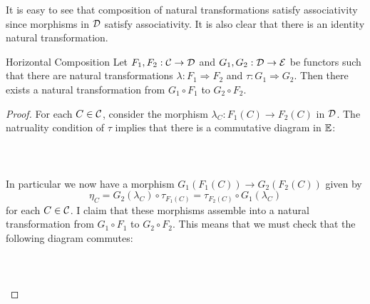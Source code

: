 \documentclass[a4paper]{article}
\begin{document}
It is easy to see that composition of natural transformations satisfy associativity since morphisms in $\mathcal{D}$ satisfy associativity. It is also clear that there is an identity natural transformation. 

\begin{prp}{Horizontal Composition}{} Let $F_1,F_2:\mathcal{C}\to\mathcal{D}$ and $G_1,G_2:\mathcal{D}\to\mathcal{E}$ be functors such that there are natural transformations $\lambda:F_1\Rightarrow F_2$ and $\tau:G_1\Rightarrow G_2$. Then there exists a natural transformation from $G_1\circ F_1$ to $G_2\circ F_2$. \tcbline
\begin{proof}
For each $C\in\mathcal{C}$, consider the morphism $\lambda_C:F_1(C)\to F_2(C)$ in $\mathcal{D}$. The natruality condition of $\tau$ implies that there is a commutative diagram in $\mathbb{E}$: \\~\\
\\~\\
In particular we now have a morphism $G_1(F_1(C))\to G_2(F_2(C))$ given by $$\eta_C=G_2(\lambda_C)\circ\tau_{F_1(C)}=\tau_{F_2(C)}\circ G_1(\lambda_C)$$ for each $C\in\mathcal{C}$. I claim that these morphisms assemble into a natural transformation from $G_1\circ F_1$ to $G_2\circ F_2$. This means that we must check that the following diagram commutes: \\~\\
\\~\\

\end{proof}
\end{prp}
\end{document}

